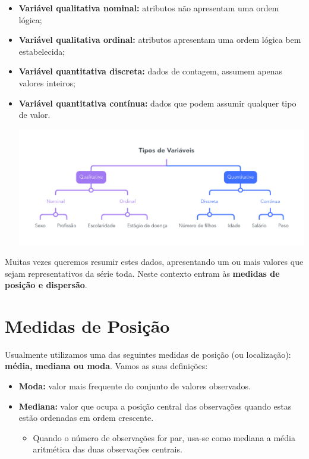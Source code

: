 \documentclass[
]{book}
\providecommand{\tightlist}{%
  \setlength{\itemsep}{0pt}\setlength{\parskip}{0pt}}
\begin{document}
\begin{itemize}
\item
  \textbf{Variável qualitativa nominal:} atributos não apresentam uma ordem lógica;
\item
  \textbf{Variável qualitativa ordinal:} atributos apresentam uma ordem lógica bem estabelecida;
\item
  \textbf{Variável quantitativa discreta:} dados de contagem, assumem apenas valores inteiros;
\item
  \textbf{Variável quantitativa contínua:} dados que podem assumir qualquer tipo de valor.

  \includegraphics{figs/tipos_de_variaveis.png}
\end{itemize}

Muitas vezes queremos resumir estes dados, apresentando um ou mais valores que sejam representativos da série toda. Neste contexto entram às \textbf{medidas de posição e dispersão}.

\hypertarget{medidas-de-posiuxe7uxe3o}{%
\section{Medidas de Posição}\label{medidas-de-posiuxe7uxe3o}}

Usualmente utilizamos uma das seguintes medidas de posição (ou localização): \textbf{média, mediana ou moda}. Vamos as suas definições:

\begin{itemize}
\item
  \textbf{Moda:} valor mais frequente do conjunto de valores observados.
\item
  \textbf{Mediana:} valor que ocupa a posição central das observações quando estas estão ordenadas em ordem crescente.

  \begin{itemize}
  \tightlist
  \item
    Quando o número de observações for par, usa-se como mediana a média aritmética das duas observações centrais.
  \end{itemize}
\end{itemize}
\end{document}
